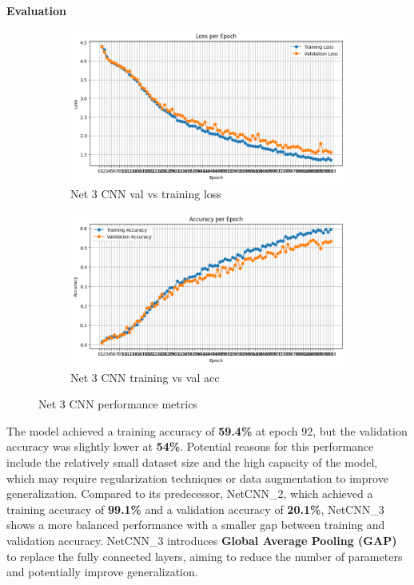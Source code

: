 \documentclass[12pt]{article}
\begin{document}
\textbf{Evaluation}
\begin{figure}[ht]
    \centering
    \begin{subfigure}{0.45\linewidth}
        \centering
        \includegraphics[width=\linewidth]{net3_loss.png}
        \caption{Net 3 CNN val vs training loss}
        \label{fig:net3_loss}
    \end{subfigure}
    \hfill
    \begin{subfigure}{0.45\linewidth}
        \centering
        \includegraphics[width=\linewidth]{net3_acc.png}
        \caption{Net 3 CNN training vs val acc}
        \label{fig:net3_acc}
    \end{subfigure}
    \caption{Net 3 CNN performance metrics}
    \label{fig:net3_performance}
\end{figure}

The model achieved a training accuracy of \textbf{59.4\%} at epoch 92, but the validation accuracy was slightly lower at \textbf{54\%}. Potential reasons for this performance include the relatively small dataset size and the high capacity of the model, which may require regularization techniques or data augmentation to improve generalization. Compared to its predecessor, NetCNN\_2, which achieved a training accuracy of \textbf{99.1\%} and a validation accuracy of \textbf{20.1\%}, NetCNN\_3 shows a more balanced performance with a smaller gap between training and validation accuracy. NetCNN\_3 introduces \textbf{Global Average Pooling (GAP)} to replace the fully connected layers, aiming to reduce the number of parameters and potentially improve generalization.
\end{document}
